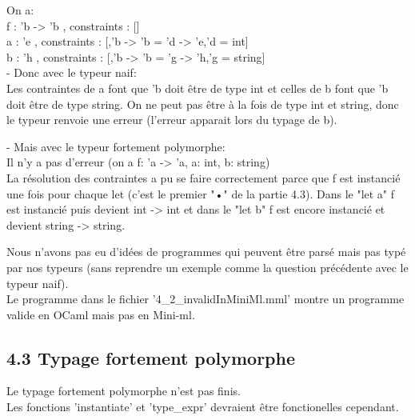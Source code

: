 \documentclass{article}
\begin{document}
{
  On a:\\
  f : 'b -> 'b  , constraints : []\\
  a : 'e        , constraints : [,'b -> 'b = 'd -> 'e,'d = int]\\
  b : 'h        , constraints : [,'b -> 'b = 'g -> 'h,'g = string]\\

  - Donc avec le typeur naif:\\
  Les contraintes de a font que 'b doit être de type int et celles de b font que
  'b doit être de type string. On ne peut pas être à la fois de type int et
  string, donc le typeur renvoie une erreur (l'erreur apparait lors du typage de b).

  - Mais avec le typeur fortement polymorphe:\\
  Il n'y a pas d'erreur (on a f: 'a -> 'a, a: int, b: string)\\
  La résolution des contraintes a pu se faire correctement parce que f est 
  instancié une fois pour chaque let (c'est le premier "•" de la partie 4.3).
  Dans le "let a" f est instancié puis devient int -> int et dans le "let b" f est 
  encore instancié et devient string -> string.

}
{}

{
  Nous n'avons pas eu d'idées de programmes qui peuvent être parsé mais pas typé
  par nos typeurs (sans reprendre un exemple comme la question précédente avec le typeur naif).\\
  Le programme dans le fichier '4\_2\_invalidInMiniMl.mml' montre un programme valide
  en OCaml mais pas en Mini-ml.
}
{}

\subsection{4.3 Typage fortement polymorphe}

{}
{
  Le typage fortement polymorphe n'est pas finis.\\
  Les fonctions 'instantiate' et 'type\_expr' devraient être fonctionelles
  cependant.
}
\end{document}
